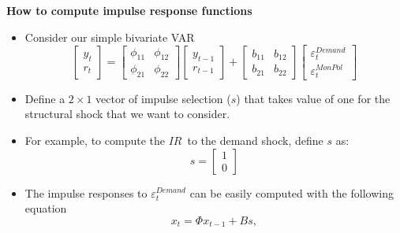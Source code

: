\begin{frame}
{\textbf{How to compute {impulse response functions}}}\bigskip

\begin{itemize}
\item Consider our simple bivariate VAR%
\begin{equation*}
\left[ 
\begin{array}{c}
y_{t} \\ 
r_{t}%
\end{array}%
\right] =%
\begin{bmatrix}
\phi _{11} & \phi _{12} \\ 
\phi _{21} & \phi _{22}%
\end{bmatrix}%
\left[ 
\begin{array}{c}
y_{t-1} \\ 
r_{t-1}%
\end{array}%
\right] +\left[ 
\begin{array}{cc}
b_{11} & b_{12} \\ 
b_{21} & b_{22}%
\end{array}%
\right] 
\begin{bmatrix}
\varepsilon _{t}^{Demand} \\ 
\varepsilon _{t}^{MonPol}%
\end{bmatrix}%
\end{equation*}

\item Define a $2\times 1$ vector of impulse selection ($s$) that takes
value of one for the structural shock that we want to consider.\bigskip

\item For example, to compute the $IR$\ to the demand shock, define $s$ as:%
\begin{equation*}
s=\left[ 
\begin{array}{c}
1 \\ 
0%
\end{array}%
\right]
\end{equation*}

\item The impulse responses to $\varepsilon _{t}^{Demand}$ can be easily
computed with the following equation%
\begin{equation*}
x_{t}=\Phi x_{t-1}+Bs,
\end{equation*}
\end{itemize}
\end{frame}


